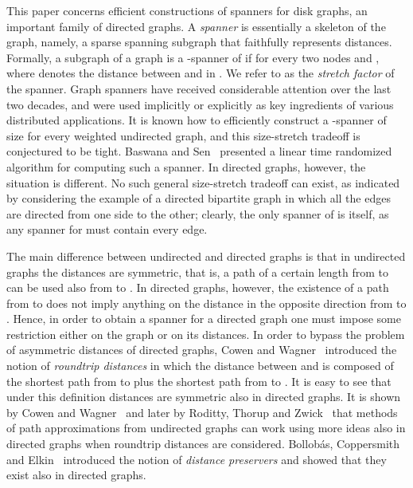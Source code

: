 \documentclass[proceedings]{stacs}
\theoremstyle{plain}\newtheorem{satz}[thm]{Satz}
\theoremstyle{definition}\newtheorem{crucial}[thm]{Crucial Definition}
\begin{document}
This paper concerns efficient constructions of spanners for disk
graphs, an important family of directed graphs. A {\em spanner} is
essentially a skeleton of the graph, namely, a sparse spanning
subgraph that faithfully represents distances. Formally, a
subgraph  of a graph  is a -spanner of  if
 for every two nodes 
and , where  denotes the distance between 
and  in . We refer to  as the {\em stretch factor} of
the spanner. Graph spanners have received considerable attention
over the last two decades, and were used implicitly or explicitly
as key ingredients of various distributed applications. It is
known how to efficiently construct a -spanner of size
 for every weighted undirected graph, and this
size-stretch tradeoff is conjectured to be tight. Baswana and
Sen~\cite{BaSe07} presented a linear time randomized algorithm for
computing such a spanner. In directed graphs, however, the
situation is different. No such general size-stretch tradeoff can
exist, as indicated by considering the example of a directed
bipartite graph  in which all the edges are directed from one
side to the other; clearly, the only spanner of  is  itself,
as any spanner for  must contain every edge.

The main difference between undirected and directed graphs is that
in undirected graphs the distances are symmetric, that is, a path
of a certain length from  to  can be used also from  to
. In directed graphs, however, the existence of a path from 
to  does not imply anything on the distance in the opposite
direction from  to . Hence, in order to obtain a spanner for
a directed graph one must impose some restriction either on the
graph or on its distances. In order to bypass the problem of
asymmetric distances of directed graphs, Cowen and
Wagner~\cite{CoWa99} introduced the notion of {\em roundtrip
distances} in which the distance between  and  is composed
of the shortest path from  to  plus the shortest path from
 to . It is easy to see that under this definition distances
are symmetric also in directed graphs. It is shown by Cowen and
Wagner~\cite{CoWa99} and later by Roditty, Thorup and
Zwick~\cite{RoThZw08} that methods of path approximations from
undirected graphs can work using more ideas also in directed
graphs when roundtrip distances are considered. Bollob{\'a}s,
Coppersmith and Elkin~\cite{BoCoEl05} introduced the notion of
{\em distance preservers} and showed that they exist also in
directed graphs.
\end{document}
